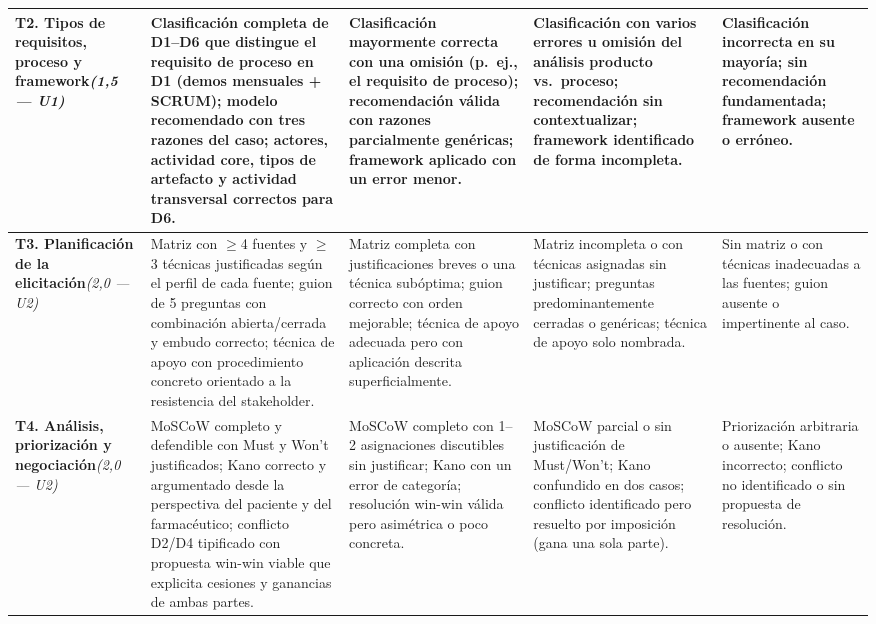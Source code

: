 \documentclass[11pt]{article}
\begin{document}
\begin{landscape}
{\begin{longtable}{|L{3.2cm}|L{5.6cm}|L{5.3cm}|L{4.9cm}|L{4.3cm}|}
\textbf{T2. Tipos de requisitos, proceso y framework}\newline\textit{(1{,}5 — U1)} &
Clasificación completa de D1--D6 que distingue el requisito de \textbf{proceso} en D1 (demos mensuales + SCRUM); modelo recomendado con tres razones del caso; actores, actividad core, tipos de artefacto y actividad transversal correctos para D6. &
Clasificación mayormente correcta con una omisión (p.\ ej., el requisito de proceso); recomendación válida con razones parcialmente genéricas; framework aplicado con un error menor. &
Clasificación con varios errores u omisión del análisis producto vs.\ proceso; recomendación sin contextualizar; framework identificado de forma incompleta. &
Clasificación incorrecta en su mayoría; sin recomendación fundamentada; framework ausente o erróneo. \\
\hline

\textbf{T3. Planificación de la elicitación}\newline\textit{(2{,}0 — U2)} &
Matriz con $\geq$4 fuentes y $\geq$3 técnicas justificadas según el perfil de cada fuente; guion de 5 preguntas con combinación abierta/cerrada y embudo correcto; técnica de apoyo con procedimiento concreto orientado a la resistencia del stakeholder. &
Matriz completa con justificaciones breves o una técnica subóptima; guion correcto con orden mejorable; técnica de apoyo adecuada pero con aplicación descrita superficialmente. &
Matriz incompleta o con técnicas asignadas sin justificar; preguntas predominantemente cerradas o genéricas; técnica de apoyo solo nombrada. &
Sin matriz o con técnicas inadecuadas a las fuentes; guion ausente o impertinente al caso. \\
\hline

\textbf{T4. Análisis, priorización y negociación}\newline\textit{(2{,}0 — U2)} &
MoSCoW completo y defendible con Must y Won't justificados; Kano correcto y argumentado desde la perspectiva del paciente y del farmacéutico; conflicto D2/D4 tipificado con propuesta win-win viable que explicita cesiones y ganancias de ambas partes. &
MoSCoW completo con 1--2 asignaciones discutibles sin justificar; Kano con un error de categoría; resolución win-win válida pero asimétrica o poco concreta. &
MoSCoW parcial o sin justificación de Must/Won't; Kano confundido en dos casos; conflicto identificado pero resuelto por imposición (gana una sola parte). &
Priorización arbitraria o ausente; Kano incorrecto; conflicto no identificado o sin propuesta de resolución. \\
\hline


\end{longtable}}
\end{landscape}
\end{document}
